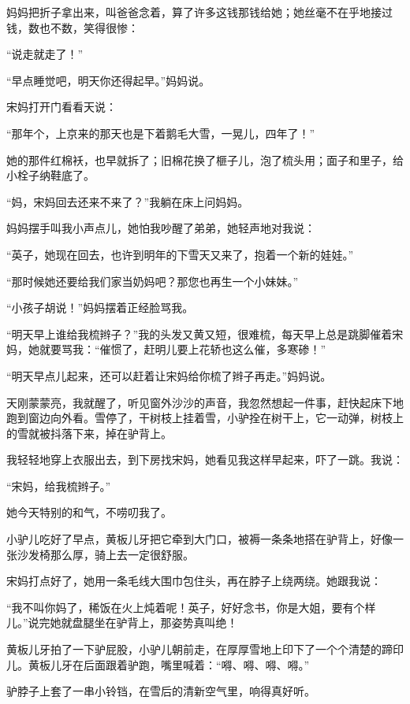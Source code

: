 \par 妈妈把折子拿出来，叫爸爸念着，算了许多这钱那钱给她；她丝毫不在乎地接过钱，数也不数，笑得很惨：
\par “说走就走了！”
\par “早点睡觉吧，明天你还得起早。”妈妈说。
\par 宋妈打开门看看天说：
\par “那年个，上京来的那天也是下着鹅毛大雪，一晃儿，四年了！”
\par 她的那件红棉袄，也早就拆了；旧棉花换了榧子儿，泡了梳头用；面子和里子，给小栓子纳鞋底了。
\par “妈，宋妈回去还来不来了？”我躺在床上问妈妈。
\par 妈妈摆手叫我小声点儿，她怕我吵醒了弟弟，她轻声地对我说：
\par “英子，她现在回去，也许到明年的下雪天又来了，抱着一个新的娃娃。”
\par “那时候她还要给我们家当奶妈吧？那您也再生一个小妹妹。”
\par “小孩子胡说！”妈妈摆着正经脸骂我。
\par “明天早上谁给我梳辫子？”我的头发又黄又短，很难梳，每天早上总是跳脚催着宋妈，她就要骂我：“催惯了，赶明儿要上花轿也这么催，多寒碜！”
\par “明天早点儿起来，还可以赶着让宋妈给你梳了辫子再走。”妈妈说。
\par 天刚蒙蒙亮，我就醒了，听见窗外沙沙的声音，我忽然想起一件事，赶快起床下地跑到窗边向外看。雪停了，干树枝上挂着雪，小驴拴在树干上，它一动弹，树枝上的雪就被抖落下来，掉在驴背上。
\par 我轻轻地穿上衣服出去，到下房找宋妈，她看见我这样早起来，吓了一跳。我说：
\par “宋妈，给我梳辫子。”
\par 她今天特别的和气，不唠叨我了。
\par 小驴儿吃好了早点，黄板儿牙把它牵到大门口，被褥一条条地搭在驴背上，好像一张沙发椅那么厚，骑上去一定很舒服。
\par 宋妈打点好了，她用一条毛线大围巾包住头，再在脖子上绕两绕。她跟我说：
\par “我不叫你妈了，稀饭在火上炖着呢！英子，好好念书，你是大姐，要有个样儿。”说完她就盘腿坐在驴背上，那姿势真叫绝！
\par 黄板儿牙拍了一下驴屁股，小驴儿朝前走，在厚厚雪地上印下了一个个清楚的蹄印儿。黄板儿牙在后面跟着驴跑，嘴里喊着：“嘚、嘚、嘚、嘚。”
\par 驴脖子上套了一串小铃铛，在雪后的清新空气里，响得真好听。




